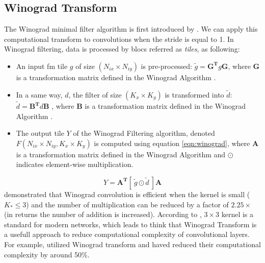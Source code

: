 \subsection{Winograd Transform}
%
%
The Winograd minimal filter algorithm is first introduced by \cite{winograd_arithmetic_1980}. We can apply this computational transform to convolutions when the stride is equal to 1. In Winograd filtering, data is processed by blocs referred as \textit{tiles}, as following:
\begin{itemize}
    \item An input \acrshort{fm} tile $g$ of size $(N_{ix} \times N_{iy})$ is pre-processed: $\tilde{g} = \boldsymbol{G^{T}} g \boldsymbol{G} $, where $\boldsymbol{G}$ is a transformation matrix defined in the Winograd Algorithm \cite{winograd_arithmetic_1980}.
    \item In a same way, $d$, the filter of size $(K_x \times K_y)$ is transformed into $\tilde{d}$: $\tilde{d} = \boldsymbol{B^{T}} d \boldsymbol{B}$ , where $\boldsymbol{B}$ is a transformation matrix defined in the Winograd Algorithm \cite{winograd_arithmetic_1980}.
    \item The output tile $Y$ of the Winograd Filtering algorithm, denoted $F(N_{ix} \times N_{iy}, K_x \times K_y)$ is computed using equation \ref{eqn:winograd}, where $\boldsymbol{A}$ is a transformation matrix defined in the Winograd Algorithm \cite{winograd_arithmetic_1980} and $\odot$ indicates element-wise multiplication.
\end{itemize}
\begin{equation}
\label{eqn:winograd}
Y = \boldsymbol{A^{T}} [ \ \tilde{g} \odot \tilde{d} \ ] \boldsymbol{A}
\end{equation}
\cite{lavin_fast_2015} demonstrated that Winograd convolution is efficient when the kernel is small ($K_* \leq 3$) and the number of multiplication can be reduced by a factor of $2.25 \times$ (in returns the number of addition is increased). According to \cite{sandler_mobilenetv2_2019}, $3 \times 3$ kernel is a standard for modern networks, which leads to think that Winograd Transform is a usefull approach to reduce computational complexity of convolutional layers. For example, \cite{aydonat_opencl_2017, lu_evaluating_2017} utilized Winograd transform and haved reduced their computational complexity by around 50\%.
%
%
